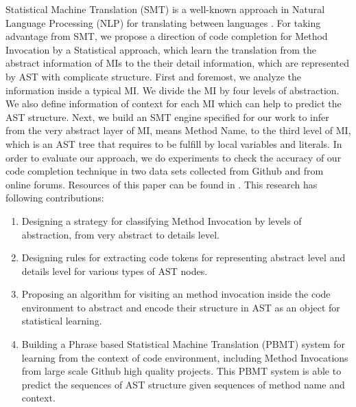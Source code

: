 Statistical Machine Translation (SMT) is a well-known approach in Natural Language Processing (NLP) for translating between languages \cite{Green2014}. For taking advantage from SMT, we propose a direction of code completion for Method Invocation by a Statistical approach, which learn the translation from the abstract information of MIs to the their detail information, which are represented by AST with complicate structure. First and foremost, we analyze the information inside a typical MI. We divide the MI by four levels of abstraction. We also define information of context for each MI which can help to predict the AST structure. Next, we build an SMT engine specified for our work to infer from the very abstract layer of MI, means Method Name, to the third level of MI, which is an AST tree that requires to be fulfill by local variables and literals. In order to evaluate our approach, we do experiments to check the accuracy of our code completion technique in two data sets collected from Github and from online forums. Resources of this paper can be found in \cite{id:InvocMap}. This research has following contributions:
\begin{enumerate}
  \item Designing a strategy for classifying Method Invocation by levels of abstraction, from very abstract to details level.
  \item Designing rules for extracting code tokens for representing abstract level and details level for various types of AST nodes.
  \item Proposing an algorithm for visiting an method invocation inside the code environment to abstract and encode their structure in AST as an object for statistical learning.
  \item Building a Phrase based Statistical Machine Translation (PBMT) system for learning from the context of code environment, including Method Invocations from large scale Github high quality projects. This PBMT system is able to predict the sequences of AST structure given sequences of method name and context.  
\end{enumerate}




